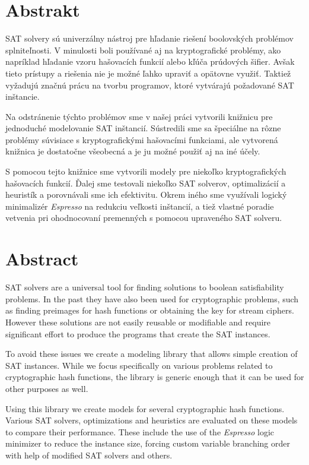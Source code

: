 \chapter*{Abstrakt}
SAT solvery sú univerzálny nástroj pre hľadanie riešení boolovských problémov spl\-ni\-teľ\-no\-sti.
V minulosti boli používané aj na kryptografické problémy, ako napríklad hľadanie vzoru hašovacích funkcií alebo kľúča prúdových šifier.
Avšak tieto prístupy a riešenia nie je možné ľahko upraviť a opätovne využiť.
Taktiež vyžadujú značnú prácu na tvorbu programov, ktoré vytvárajú požadované SAT inštancie.

Na odstránenie týchto problémov sme v našej práci vytvorili knižnicu pre jednoduché modelovanie SAT inštancií.
Sústredili sme sa špeciálne na rôzne problémy súvisiace s kryptografickými hašovacími funkciami, ale vytvorená knižnica je dostatočne všeobecná a je ju možné použiť aj na iné účely.

S pomocou tejto knižnice sme vytvorili modely pre niekoľko kryptografických hašovacích funkcií.
Ďalej sme testovali niekoľko SAT solverov, optimalizácií a heuristík a porovnávali sme ich efektivitu.
Okrem iného sme využívali logický minimalizér \emph{Espresso} na redukciu veľkosti inštancií, a tiež vlastné poradie vetvenia pri ohodnocovaní premenných s pomocou upraveného SAT solveru.

\chapter*{Abstract}
SAT solvers are a universal tool for finding solutions to boolean satisfiability problems.
In the past they have also been used for cryptographic problems, such as finding preimages for hash functions or obtaining the key for stream ciphers.
However these solutions are not easily reusable or modifiable and require significant effort to produce the programs that create the SAT instances.

To avoid these issues we create a modeling library that allows simple creation of SAT instances.
While we focus specifically on various problems related to cryptographic hash functions, the library is generic enough that it can be used for other purposes as well.

Using this library we create models for several cryptographic hash functions.
Various SAT solvers, optimizations and heuristics are evaluated on these models to compare their performance.
These include the use of the \emph{Espresso} logic minimizer to reduce the instance size, forcing custom variable branching order with help of modified SAT solvers and others.